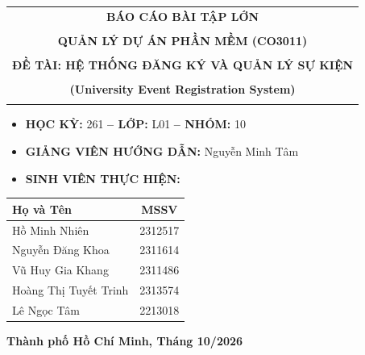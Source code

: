 \documentclass[a4paper]{article}
\theoremstyle{definition}
\begin{document}
\begin{titlepage}
\begin{center}
\begin{tabular}{c}
\multicolumn{1}{c}{
    \textbf{{\LARGE BÁO CÁO BÀI TẬP LỚN}}
}
\\
\\
{\textbf{
    {\LARGE QUẢN LÝ DỰ ÁN PHẦN MỀM (CO3011)}
}}
\\
\\
\textbf{\LARGE ĐỀ TÀI: HỆ THỐNG ĐĂNG KÝ VÀ QUẢN LÝ SỰ KIỆN}
\\
\\
\textbf{\Large (University Event Registration System)}
\\

\\

\end{tabular}

\end{center}



\begin{itemize}

\renewcommand\labelitemi{--}

    \item
    \Large
    \textbf{HỌC KỲ:} 261 \textbf{-- LỚP:} L01 \textbf{-- NHÓM:} 10

    \item
    \Large
    \textbf{GIẢNG VIÊN HƯỚNG DẪN:} Nguyễn Minh Tâm

    \item
    \Large
    \textbf{SINH VIÊN THỰC HIỆN:}

\end{itemize}

\vspace{0.2cm}

\begin{center}
    \Large
    \renewcommand{\arraystretch}{1.5}
    \begin{tabularx}{0.6\textwidth}{|>{\centering\arraybackslash}X|c|}
        \hline
        \textbf{Họ và Tên} & \textbf{MSSV} \\
        \hline
        Hồ Minh Nhiên & 2312517 \\
        \hline
        Nguyễn Đăng Khoa & 2311614 \\
        \hline
        Vũ Huy Gia Khang & 2311486 \\
        \hline
        Hoàng Thị Tuyết Trinh & 2313574 \\
        \hline
        Lê Ngọc Tâm & 2213018 \\
        \hline
    \end{tabularx}
\end{center}

\vspace{0.6cm}



\begin{center}

{\Large \textbf{
Thành phố Hồ Chí Minh, Tháng 10/2026
}}

\end{center}


\end{titlepage}
\end{document}
